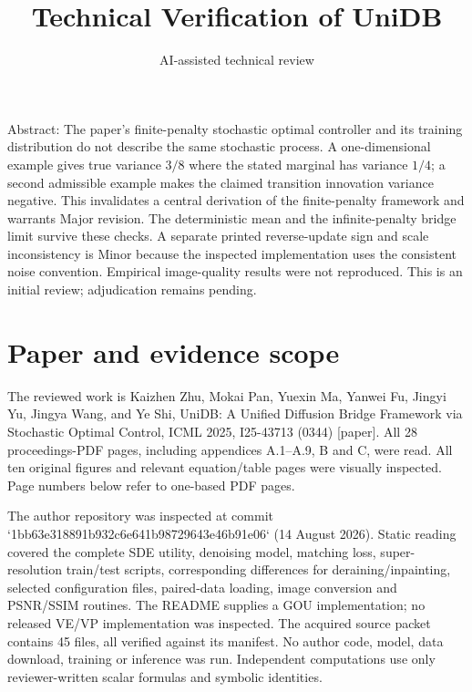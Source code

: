 \documentclass[10pt]{article}
\title{Technical Verification of UniDB}
\author{AI-assisted technical review}
\date{}
\begin{document}
\maketitle
Abstract: The paper’s finite-penalty stochastic optimal controller and its training distribution do not describe the same stochastic process. A one-dimensional example gives true variance \(3/8\) where the stated marginal has variance \(1/4\); a second admissible example makes the claimed transition innovation variance negative. This invalidates a central derivation of the finite-penalty framework and warrants Major revision. The deterministic mean and the infinite-penalty bridge limit survive these checks. A separate printed reverse-update sign and scale inconsistency is Minor because the inspected implementation uses the consistent noise convention. Empirical image-quality results were not reproduced. This is an initial review; adjudication remains pending.\par
\section*{Paper and evidence scope}
The reviewed work is Kaizhen Zhu, Mokai Pan, Yuexin Ma, Yanwei Fu, Jingyi Yu, Jingya Wang, and Ye Shi, UniDB: A Unified Diffusion Bridge Framework via Stochastic Optimal Control, ICML 2025, I25-43713 (0344) [paper]. All 28 proceedings-PDF pages, including appendices A.1–A.9, B and C, were read. All ten original figures and relevant equation/table pages were visually inspected. Page numbers below refer to one-based PDF pages.\par
The author repository was inspected at commit `1bb63e318891b932c6e641b98729643e46b91e06` (14 August 2026). Static reading covered the complete SDE utility, denoising model, matching loss, super-resolution train/test scripts, corresponding differences for deraining/inpainting, selected configuration files, paired-data loading, image conversion and PSNR/SSIM routines. The README supplies a GOU implementation; no released VE/VP implementation was inspected. The acquired source packet contains 45 files, all verified against its manifest. No author code, model, data download, training or inference was run. Independent computations use only reviewer-written scalar formulas and symbolic identities.\par
\end{document}
